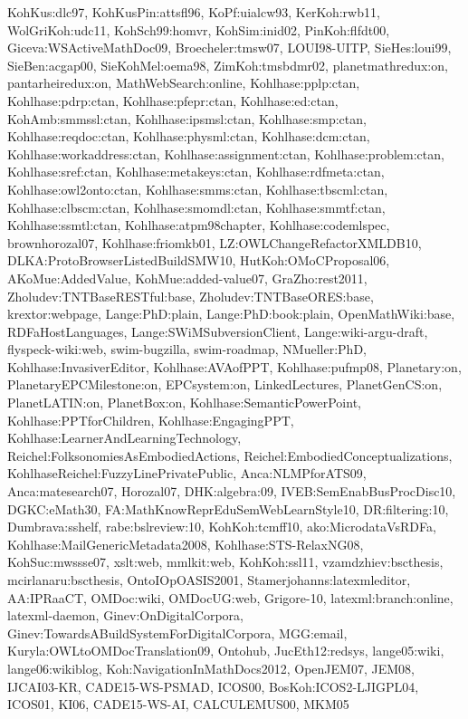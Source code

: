 {KohKus:dlc97,%
KohKusPin:attsfl96,%
KoPf:uialcw93,%
KerKoh:rwb11,%
WolGriKoh:udc11,%
KohSch99:homvr,%
KohSim:inid02,%
PinKoh:flfdt00,%
Giceva:WSActiveMathDoc09,%
Broecheler:tmsw07,%
LOUI98-UITP,%
SieHes:loui99,%
SieBen:acgap00,%
SieKohMel:oema98,%
ZimKoh:tmsbdmr02,%
planetmathredux:on,%
pantarheiredux:on,%
MathWebSearch:online,%
Kohlhase:pplp:ctan,%
Kohlhase:pdrp:ctan,%
Kohlhase:pfepr:ctan,%
Kohlhase:ed:ctan,%
KohAmb:smmssl:ctan,%
Kohlhase:ipsmsl:ctan,%
Kohlhase:smp:ctan,%
Kohlhase:reqdoc:ctan,%
Kohlhase:physml:ctan,%
Kohlhase:dcm:ctan,%
Kohlhase:workaddress:ctan,%
Kohlhase:assignment:ctan,%
Kohlhase:problem:ctan,%
Kohlhase:sref:ctan,%
Kohlhase:metakeys:ctan,%
Kohlhase:rdfmeta:ctan,%
Kohlhase:owl2onto:ctan,%
Kohlhase:smms:ctan,%
Kohlhase:tbscml:ctan,%
Kohlhase:clbscm:ctan,%
Kohlhase:smomdl:ctan,%
Kohlhase:smmtf:ctan,%
Kohlhase:ssmtl:ctan,%
Kohlhase:atpm98chapter,%
Kohlhase:codemlspec,%
brownhorozal07,%
Kohlhase:friomkb01,%
LZ:OWLChangeRefactorXMLDB10,%
DLKA:ProtoBrowserListedBuildSMW10,%
HutKoh:OMoCProposal06,%
AKoMue:AddedValue,%
KohMue:added-value07,%
GraZho:rest2011,%
Zholudev:TNTBaseRESTful:base,%
Zholudev:TNTBaseORES:base,%
krextor:webpage,%
Lange:PhD:plain,%
Lange:PhD:book:plain,%
OpenMathWiki:base,%
RDFaHostLanguages,%
Lange:SWiMSubversionClient,%
Lange:wiki-argu-draft,%
flyspeck-wiki:web,%
swim-bugzilla,%
swim-roadmap,%
NMueller:PhD,%
Kohlhase:InvasiverEditor,%
Kohlhase:AVAofPPT,%
Kohlhase:pufmp08,%
Planetary:on,%
PlanetaryEPCMilestone:on,%
EPCsystem:on,%
LinkedLectures,%
PlanetGenCS:on,%
PlanetLATIN:on,%
PlanetBox:on,%
Kohlhase:SemanticPowerPoint,%
Kohlhase:PPTforChildren,%
Kohlhase:EngagingPPT,%
Kohlhase:LearnerAndLearningTechnology,%
Reichel:FolksonomiesAsEmbodiedActions,%
Reichel:EmbodiedConceptualizations,%
KohlhaseReichel:FuzzyLinePrivatePublic,%
Anca:NLMPforATS09,%
Anca:matesearch07,%
Horozal07,%
DHK:algebra:09,%
IVEB:SemEnabBusProcDisc10,%
DGKC:eMath30,%
FA:MathKnowReprEduSemWebLearnStyle10,%
DR:filtering:10,%
Dumbrava:sshelf,%
rabe:bslreview:10,%
KohKoh:tcmff10,%
ako:MicrodataVsRDFa,%
Kohlhase:MailGenericMetadata2008,%
Kohlhase:STS-RelaxNG08,%
KohSuc:mwssse07,%
xslt:web,%
mmlkit:web,%
KohKoh:ssl11,%
vzamdzhiev:bscthesis,%
mcirlanaru:bscthesis,%
OntoIOpOASIS2001,%
Stamerjohanns:latexmleditor,%
AA:IPRaaCT,%
OMDoc:wiki,%
OMDocUG:web,%
Grigore-10,%
latexml:branch:online,%
latexml-daemon,%
Ginev:OnDigitalCorpora,%
Ginev:TowardsABuildSystemForDigitalCorpora,%
MGG:email,%
Kuryla:OWLtoOMDocTranslation09,%
Ontohub,%
JucEth12:redsys,%
lange05:wiki,%
lange06:wikiblog,%
Koh:NavigationInMathDocs2012,%
OpenJEM07,%
JEM08,%
IJCAI03-KR,%
CADE15-WS-PSMAD,%
ICOS00,%
BosKoh:ICOS2-LJIGPL04,%
ICOS01,%
KI06,%
CADE15-WS-AI,%
CALCULEMUS00,%
MKM05%
}
